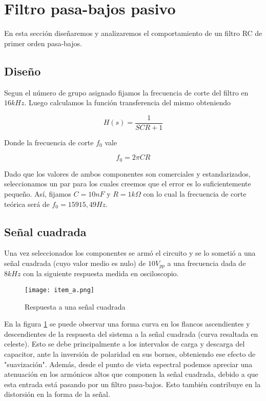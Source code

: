 
\section{Filtro pasa-bajos pasivo}

En esta secci\'on dise\~naremos y analizaremos el comportamiento de un filtro RC de primer orden pasa-bajos.

\subsection{Dise\~no}
Segun el n\'umero de grupo asignado fijamos la frecuencia de corte del filtro en $16kHz$. Luego calculamos la funci\'on transferencia del mismo obteniendo

\begin{equation}\label{ganancia_2}
H(s) = \frac{1}{SCR+1}
\end{equation}

Donde la frecuencia de corte $f_{0}$ vale

\begin{equation}\label{freccorte_2}
f_{0} = 2\pi CR
\end{equation}

Dado que los valores de ambos componentes son comerciales y estandarizados, seleccionamos un par para los cuales creemos que el error es lo suficientemente peque\~no. As\'i, fijamos $C=10nF$ y $R=1k\Omega$ con lo cual la frecuencia de corte te\'orica ser\'a de $f_{0}=15915,49Hz$.

\subsection{Se\~nal cuadrada}

Una vez seleccionados los componentes se arm\'o el circuito y se lo someti\'o a una se\~nal cuadrada (cuyo valor medio es nulo) de $10V_{pp}$ a una frecuencia dada de $8kHz$ con la siguiente respuesta medida en osciloscopio.

\begin{figure}[h!]
    \centering
    \texttt{[image: item\_a.png]}
    \caption{Respuesta a una se\~nal cuadrada}
    \label{fig:rtacuad_2} 
\end{figure}

En la figura \ref{fig:rtacuad_2} se puede observar una forma curva en los flancos ascendientes y descendientes de la respuesta del sistema a la se\~nal cuadrada (curva resaltada en celeste). Esto se debe principalmente a los intervalos de carga y descarga del capacitor, ante la inversi\'on de polaridad en sus bornes, obteniendo ese efecto de "suavizaci\'on". Adem\'as, desde el punto de vista espectral podemos apreciar una atenuaci\'on en los arm\'onicos altos que componen la se\~nal cuadrada, debido a que esta entrada est\'a pasando por un filtro pasa-bajos. Esto tambi\'en contribuye en la distorsi\'on en la forma de la se\~nal.

